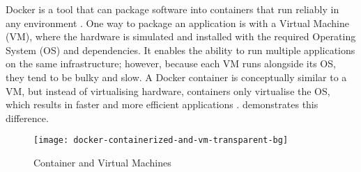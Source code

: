 Docker is a tool that can package software into containers that run reliably in
any environment . One way to package an application is
with a Virtual Machine (VM), where the hardware is simulated and installed with
the required Operating System (OS) and dependencies. It enables the ability to
run multiple applications on the same infrastructure; however, because each VM
runs alongside its OS, they tend to be bulky and slow. A Docker container is
conceptually similar to a VM, but instead of virtualising hardware, containers
only virtualise the OS, which results in faster and more efficient applications
.  demonstrates this
difference.

\begin{figure*}[!htb]
  \centering
  \texttt{[image: docker-containerized-and-vm-transparent-bg]}
  \caption{Container and Virtual Machines}
  \label{fig:docker_container_vm}
\end{figure*}
